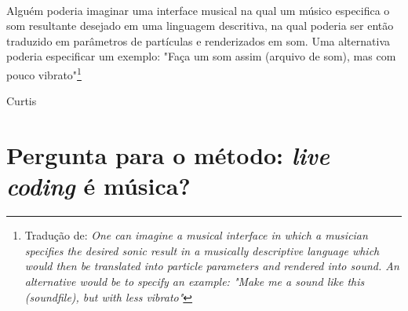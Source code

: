 \documentclass[
	12pt,				%
	openright,			%
	twoside,			%
	a4paper,			%
	english,			%
	french,				%
	spanish,			%
        italian,                        %
	brazil				%
	]{abntex2}
\begin{document}
\vfil \ 

\newpage


\epigraph{Alguém poderia imaginar uma interface musical na qual um músico especifica o som resultante desejado em uma linguagem descritiva, na qual poderia ser então traduzido em parâmetros de partículas e renderizados em som. Uma alternativa poderia especificar um exemplo: "Faça um som assim (arquivo de som), mas com pouco vibrato"\footnote{Tradução de: \emph{One can imagine a musical interface in which a musician specifies the desired sonic result in a musically descriptive language which would then be translated into particle parameters and rendered into sound. An alternative would be to specify an example: "Make me a sound like this (soundfile), but with less vibrato"}}}{Curtis }
\newpage


%
\tableofcontents*
\cleardoublepage
\textual




\begingroup
\let\clearpage\relax
\chapter{Pergunta para o método: \emph{live coding} é música?}\label{cap:introducao}

\endgroup
\end{document}
